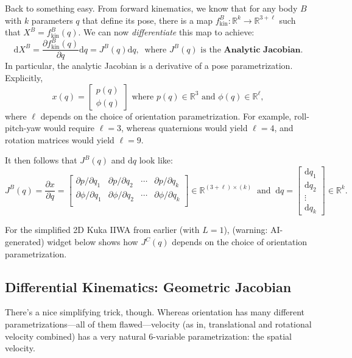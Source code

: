 Back to something easy.
From forward kinematics, we know that
for any body $B$ with $k$ parameters $q$
that define its pose, there is a map
$f_{\mathrm{kin}}^B \colon \mathbb{R}^k \to \mathbb{R}^{3 + \ell}$
such that $X^B = f_{\mathrm{kin}}^B(q)$.
We can now \emph{differentiate} this map to achieve:
\[
\mathrm{d}X^B =
\frac{\partial f_{\mathrm{kin}}^B(q)}{\partial q} \mathrm{d}q
= J^B(q) \mathrm{d}q,
~ \text{ where } J^B(q) \text{ is the } \textbf{Analytic Jacobian.}
\]
In particular, the analytic Jacobian is
a derivative of a pose parametrization.  Explicitly,
\[ x(q) = \begin{bmatrix} p(q) \\ \phi(q) \end{bmatrix}
\text{ where } p(q) \in \mathbb{R}^3
\text{ and } \phi(q) \in \mathbb{R}^{\ell}, \]
where $\ell$ depends on the choice of orientation parametrization.
For example, roll-pitch-yaw would require $\ell = 3$,
whereas quaternions would yield $\ell = 4$,
and rotation matrices would yield $\ell = 9$.

It then follows that $J^B(q)$ and $\mathrm{d}q$ look like:
\[ J^B(q) = \frac{\partial x}{\partial q} = \begin{bmatrix}
\partial p/\partial q_1 & \partial p/\partial q_2
& \cdots & \partial p/\partial q_k \\
\partial \phi/\partial q_1 & \partial \phi/\partial q_2
& \cdots & \partial \phi/\partial q_k \\
\end{bmatrix}
\in \mathbb{R}^{(3 + \ell) \times (k)}
~ \text{ and } ~
\mathrm{d}q = \begin{bmatrix}
\mathrm{d}q_1 \\ \mathrm{d}q_2 \\ \vdots \\ \mathrm{d}q_k
\end{bmatrix} \in \mathbb{R}^k. \]

For the simplified 2D Kuka IIWA from earlier (with $L = 1$),
(warning: AI-generated) widget below shows how $J^C(q)$ depends on
the choice of orientation parametrization.


\subsection{Differential Kinematics: Geometric Jacobian}

There's a nice simplifying trick, though.
Whereas orientation has many different parametrizations---all
of them flawed---velocity (as in,
translational and rotational velocity combined)
has a very natural $6$-variable parametrization:
the spatial velocity.


